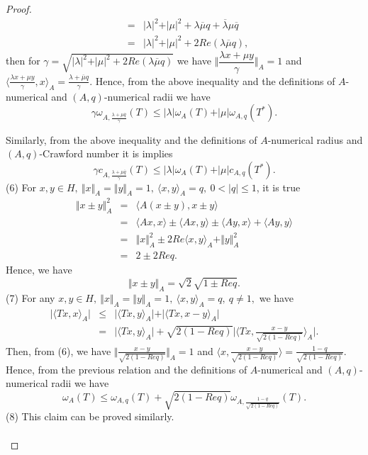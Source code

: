 \documentclass[10pt,a4paper]{amsart}
\begin{document}
\begin{proof}
\begin{eqnarray}
& = & \vert \lambda \vert^{2}+\vert \mu \vert^{2}+\lambda \overline{\mu}q+\overline{\lambda}\mu\overline{q}\nonumber \\
& = & \vert \lambda \vert^{2}+\vert \mu \vert^{2}+2Re\left( \lambda \overline{\mu}q \right), \nonumber
\end{eqnarray}
then for $ \gamma =\sqrt{\vert \lambda\vert^{2}+ \vert \mu\vert^{2}+ 2Re (\lambda \overline{\mu} q)} $ we have   $
\Vert \dfrac{\lambda x+\mu y}{\gamma}  \Vert_{A}=1 $   and $
\langle \frac{\lambda x+\mu y }{\gamma},x \rangle_{A}=\frac{\lambda +\overline{\mu} q }{\gamma}.$
Hence, from the above inequality and the definitions of $ A$-numerical and $ (A,q)$-numerical radii we have
$$
\gamma \omega_{A,\frac{\lambda + \mu \overline{q}}{\gamma}} (T)\leq \vert \lambda\vert\omega_{A}(T)+\vert \mu\vert\omega_{A,q}(T^{*}).
$$

Similarly, from the above inequality and the definitions of $ A$-numerical radius and $ (A,q)$-Crawford number it is implies
$$
\gamma c_{A,\frac{\lambda + \mu \overline{q}}{\gamma} }(T)\leq \vert \lambda\vert\omega_{A}(T)+\vert \mu\vert c_{A,q}(T^{*}).
$$
(6) For $ x,y \in H, \ \Vert x \Vert_{A}=\Vert y \Vert_{A}=1, \ \langle x,y \rangle_{A}=q, \ 0<\vert q \vert \leq 1 $, it is true 
\begin{eqnarray}\label{INeq_2}
\Vert x\pm y \Vert^{2}_{A} & = & \langle A(x\pm y),x\pm y \rangle \nonumber \\
& = & \langle Ax,x \rangle \pm \langle Ax,y \rangle \pm \langle Ay,x \rangle + \langle Ay,y \rangle \nonumber \\
& = & \Vert x \Vert_{A}^{2}\pm 2 Re \langle x,y \rangle_{A}+ \Vert y \Vert_{A}^{2} \nonumber \\
& = & 2 \pm 2 Req. 
\end{eqnarray}
Hence, we have
$$
\Vert x\pm y \Vert_{A}=\sqrt{2}\sqrt{1\pm Req}.
$$
(7) For any $ x,y \in H, \ \Vert x \Vert_{A}=\Vert y \Vert_{A}=1, \  \langle x,y \rangle_{A}=q, \ q\neq 1, $ we have 
\begin{eqnarray}
\vert \langle Tx,x\rangle_{A} \vert & \leq & \vert \langle Tx,y\rangle_{A} \vert +  \vert \langle Tx,x-y\rangle_{A} \vert \nonumber \\
& = & \vert \langle Tx,y\rangle_{A} \vert + \sqrt{2(1-Req)}\vert \langle Tx,\frac{x-y}{\sqrt{2(1-Req)}}\rangle_{A} \vert . \nonumber 
\end{eqnarray}
Then, from (6), we have $ \Vert \frac{x-y}{\sqrt{2(1-Req)}} \Vert_{A}=1 $ and $ \langle x, \frac{x-y}{\sqrt{2(1-Req)}} \rangle =\frac{1-q}{\sqrt{2(1-Req)}}. $
Hence, from the previous relation and the definitions of $ A$-numerical and $ (A,q)$-numerical radii we have
$$
\omega_{A}(T)\leq \omega_{A, q}(T)+ \sqrt{2(1-Req)}\omega_{A,\frac{1-q}{\sqrt{2(1-Req)}}}(T).
$$
(8) This claim can be proved similarly. \\ \\
  \end{proof}
\end{document}
